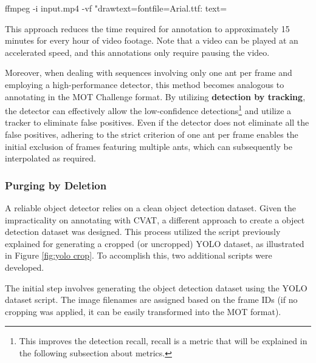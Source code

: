 \begin{footnotesize}
    \begin{bashcode}[float=!h, label={lst:frame_num_video}, language=bash, caption={Command to write the frame number on each frame}]
        ffmpeg -i input.mp4 -vf "drawtext=fontfile=Arial.ttf: text=%
    \end{bashcode}
\end{footnotesize}
\FloatBarrier

{
    This approach reduces the time required for annotation to approximately 15 minutes for every hour of video footage. 
    Note that a video can be played at an accelerated speed, and this annotations only require pausing the video.
}

{
    Moreover, when dealing with sequences involving only one ant per frame and employing a high-performance detector, 
    this method becomes analogous to annotating in the MOT Challenge format. 
    By utilizing \textbf{detection by tracking}, the detector can effectively allow the low-confidence detections\footnote{This improves the detection recall, recall is a metric that will be explained in the following subsection about metrics.} and utilize a tracker to eliminate false positives.
    Even if the detector does not eliminate all the false positives, 
    adhering to the strict criterion of one ant per frame enables the initial exclusion of frames featuring multiple ants, 
    which can subsequently be interpolated as required.
}

\subsubsection{Purging by Deletion}

{
    A reliable object detector relies on a clean object detection dataset. 
    Given the impracticality on annotating with \ac{CVAT}, a different approach to create a object detection dataset was designed.
    This process utilized the script previously explained for generating a cropped (or uncropped) YOLO dataset, as illustrated in Figure \ref{fig:yolo crop}.
    To accomplish this, two additional scripts were developed.
}

{
    The initial step involves generating the object detection dataset using the YOLO dataset script. 
    The image filenames are assigned based on the frame IDs 
    (if no cropping was applied, it can be easily transformed into the MOT format).
}

